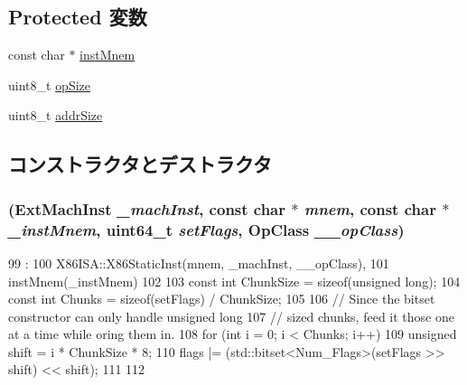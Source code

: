 \subsection*{Protected 変数}
\begin{DoxyCompactItemize}
\item 
const char $\ast$ \hyperlink{classX86ISA_1_1X86MicroopBase_a51ebef7342f07ab51f31ef4ae7e04ee0}{instMnem}
\item 
uint8\_\-t \hyperlink{classX86ISA_1_1X86MicroopBase_ad3cabad3e6f648d2da97051c2b37229b}{opSize}
\item 
uint8\_\-t \hyperlink{classX86ISA_1_1X86MicroopBase_aaff1bd964b905dbe543c06ee011c7462}{addrSize}
\end{DoxyCompactItemize}


\subsection{コンストラクタとデストラクタ}
\hypertarget{classX86ISA_1_1X86MicroopBase_a2a858ca567a05acc1514fc57cd910c66}{
\subsubsection[{X86MicroopBase}]{ ({\bf ExtMachInst} {\em \_\-machInst}, \/  const char $\ast$ {\em mnem}, \/  const char $\ast$ {\em \_\-instMnem}, \/  uint64\_\-t {\em setFlags}, \/  OpClass {\em \_\-\_\-opClass})}}
\label{classX86ISA_1_1X86MicroopBase_a2a858ca567a05acc1514fc57cd910c66}



\begin{DoxyCode}
99                                                       :
100             X86ISA::X86StaticInst(mnem, _machInst, __opClass),
101             instMnem(_instMnem)
102         {
103             const int ChunkSize = sizeof(unsigned long);
104             const int Chunks = sizeof(setFlags) / ChunkSize;
105 
106             // Since the bitset constructor can only handle unsigned long
107             // sized chunks, feed it those one at a time while oring them in.
108             for (int i = 0; i < Chunks; i++) {
109                 unsigned shift = i * ChunkSize * 8;
110                 flags |= (std::bitset<Num_Flags>(setFlags >> shift) << shift);
111             }
112         }

\end{DoxyCode}


